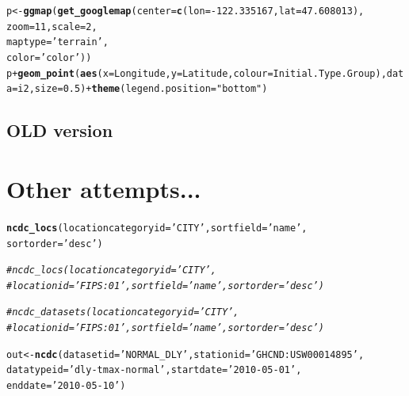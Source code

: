 \documentclass{article}\usepackage[]{graphicx}\usepackage[]{color}
\makeatletter
\newcommand{\hlnum}[1]{\textcolor[rgb]{0.686,0.059,0.569}{#1}}%
\newcommand{\hlstr}[1]{\textcolor[rgb]{0.192,0.494,0.8}{#1}}%
\newcommand{\hlcom}[1]{\textcolor[rgb]{0.678,0.584,0.686}{\textit{#1}}}%
\newcommand{\hlopt}[1]{\textcolor[rgb]{0,0,0}{#1}}%
\newcommand{\hlstd}[1]{\textcolor[rgb]{0.345,0.345,0.345}{#1}}%
\newcommand{\hlkwb}[1]{\textcolor[rgb]{0.69,0.353,0.396}{#1}}%
\newcommand{\hlkwc}[1]{\textcolor[rgb]{0.333,0.667,0.333}{#1}}%
\newcommand{\hlkwd}[1]{\textcolor[rgb]{0.737,0.353,0.396}{\textbf{#1}}}%
\newenvironment{kframe}{%
 \def\at@end@of@kframe{}%
 \ifinner\ifhmode%
  \def\at@end@of@kframe{\end{minipage}}%
  \begin{minipage}{\columnwidth}%
 \fi\fi%
 \def\FrameCommand##1{\hskip\@totalleftmargin \hskip-\fboxsep
 \colorbox{shadecolor}{##1}\hskip-\fboxsep
     \hskip-\linewidth \hskip-\@totalleftmargin \hskip\columnwidth}%
 \MakeFramed {\advance\hsize-\width
   \@totalleftmargin\z@ \linewidth\hsize
   \@setminipage}}%
 {\par\unskip\endMakeFramed%
 \at@end@of@kframe}
\newenvironment{knitrout}{}{} %
\makeatother
\begin{document}
\begin{knitrout}
\begin{kframe}
\begin{alltt}
\hlstd{p} \hlkwb{<-} \hlkwd{ggmap}\hlstd{(}\hlkwd{get_googlemap}\hlstd{(}\hlkwc{center} \hlstd{=} \hlkwd{c}\hlstd{(}\hlkwc{lon} \hlstd{=} \hlopt{-}\hlnum{122.335167}\hlstd{,} \hlkwc{lat} \hlstd{=} \hlnum{47.608013}\hlstd{),}
                    \hlkwc{zoom} \hlstd{=} \hlnum{11}\hlstd{,} \hlkwc{scale} \hlstd{=} \hlnum{2}\hlstd{,}
                    \hlkwc{maptype} \hlstd{=}\hlstr{'terrain'}\hlstd{,}
                    \hlkwc{color} \hlstd{=} \hlstr{'color'}\hlstd{))}
\hlstd{p} \hlopt{+} \hlkwd{geom_point}\hlstd{(}\hlkwd{aes}\hlstd{(}\hlkwc{x} \hlstd{= Longitude,} \hlkwc{y} \hlstd{= Latitude,}  \hlkwc{colour} \hlstd{= Initial.Type.Group),} \hlkwc{data} \hlstd{= i2,} \hlkwc{size} \hlstd{=} \hlnum{0.5}\hlstd{)} \hlopt{+} \hlkwd{theme}\hlstd{(}\hlkwc{legend.position}\hlstd{=}\hlstr{"bottom"}\hlstd{)}
\end{alltt}
\end{kframe}
\end{knitrout}



\subsection{OLD version}




\section{ Other attempts...}

\begin{knitrout}
\color{fgcolor}\begin{kframe}
\begin{alltt}
\hlkwd{ncdc_locs}\hlstd{(}\hlkwc{locationcategoryid}\hlstd{=}\hlstr{'CITY'}\hlstd{,} \hlkwc{sortfield}\hlstd{=}\hlstr{'name'}\hlstd{,}
          \hlkwc{sortorder}\hlstd{=}\hlstr{'desc'}\hlstd{)}

\hlcom{# ncdc_locs(locationcategoryid='CITY', }
\hlcom{#  locationid='FIPS:01', sortfield='name', sortorder='desc')}

\hlcom{#ncdc_datasets(locationcategoryid='CITY', }
\hlcom{#   locationid='FIPS:01', sortfield='name', sortorder='desc')}


\hlstd{out} \hlkwb{<-} \hlkwd{ncdc}\hlstd{(}\hlkwc{datasetid}\hlstd{=}\hlstr{'NORMAL_DLY'}\hlstd{,} \hlkwc{stationid}\hlstd{=}\hlstr{'GHCND:USW00014895'}\hlstd{,}
            \hlkwc{datatypeid}\hlstd{=}\hlstr{'dly-tmax-normal'}\hlstd{,} \hlkwc{startdate} \hlstd{=} \hlstr{'2010-05-01'}\hlstd{,}
            \hlkwc{enddate} \hlstd{=} \hlstr{'2010-05-10'}\hlstd{)}
\end{alltt}
\end{kframe}
\end{knitrout}
\end{document}
